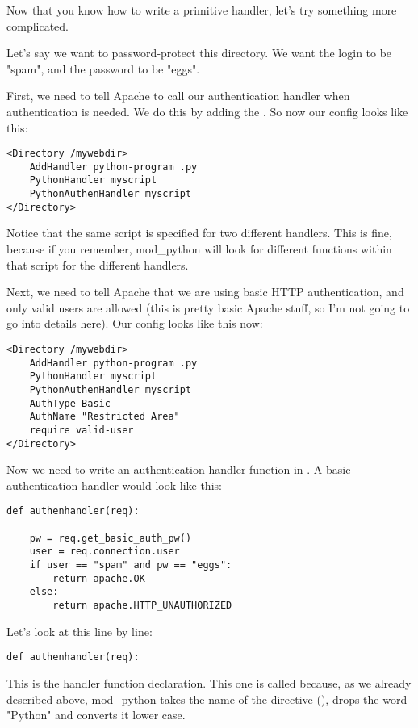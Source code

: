 Now that you know how to write a primitive handler, let's try
something more complicated.

Let's say we want to password-protect this directory. We want the
login to be "spam", and the password to be "eggs".

First, we need to tell Apache to call our authentication handler when
authentication is needed. We do this by adding the
. So now our config looks like this:

\begin{verbatim}
<Directory /mywebdir>
    AddHandler python-program .py
    PythonHandler myscript
    PythonAuthenHandler myscript
</Directory>
\end{verbatim}

Notice that the same script is specified for two different
handlers. This is fine, because if you remember, mod_python will look
for different functions within that script for the different handlers.

Next, we need to tell Apache that we are using basic HTTP
authentication, and only valid users are allowed (this is pretty basic
Apache stuff, so I'm not going to go into details here). Our config
looks like this now:

\begin{verbatim}
<Directory /mywebdir>
    AddHandler python-program .py
    PythonHandler myscript
    PythonAuthenHandler myscript
    AuthType Basic
    AuthName "Restricted Area"
    require valid-user
</Directory>
\end{verbatim}          

Now we need to write an authentication handler function in
. A basic authentication handler would look like this:

\begin{verbatim}
def authenhandler(req):

    pw = req.get_basic_auth_pw()
    user = req.connection.user     
    if user == "spam" and pw == "eggs":
        return apache.OK
    else:
        return apache.HTTP_UNAUTHORIZED
\end{verbatim}  

Let's look at this line by line: 

\begin{verbatim}
def authenhandler(req):
\end{verbatim}

This is the handler function declaration. This one is called
 because, as we already described above, mod_python takes
the name of the directive (), drops the word
"Python" and converts it lower case.

